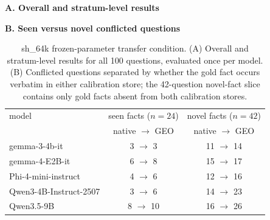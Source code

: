 \documentclass[journal=jcisd8,manuscript=article]{achemso}
\begin{document}
\begin{table}[H]\centering\small
\caption{sh\_64k frozen-parameter transfer condition. (A) Overall and stratum-level results for all 100 questions, evaluated once per model. (B) Conflicted questions separated by whether the gold fact occurs verbatim in either calibration store; the 42-question novel-fact slice contains only gold facts absent from both calibration stores.}\label{tab:sh64k}
\textbf{A. Overall and stratum-level results}\par\smallskip
{}
\par\medskip
\textbf{B. Seen versus novel conflicted questions}\par\smallskip
\begin{tabular}{lcc}\toprule
model & seen facts ($n=24$) & novel facts ($n=42$)\\
 & native $\to$ GEO & native $\to$ GEO\\\midrule
gemma-3-4b-it & 3 $\to$ 3 & 11 $\to$ 14\\
gemma-4-E2B-it & 6 $\to$ 8 & 15 $\to$ 17\\
Phi-4-mini-instruct & 4 $\to$ 6 & 12 $\to$ 16\\
Qwen3-4B-Instruct-2507 & 3 $\to$ 6 & 14 $\to$ 23\\
Qwen3.5-9B & 8 $\to$ 10 & 16 $\to$ 26\\\bottomrule
\end{tabular}\end{table}
\end{document}
